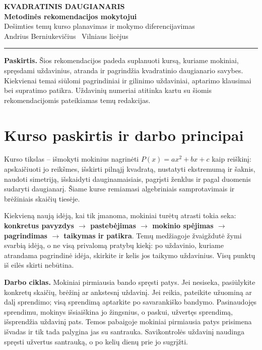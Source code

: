 \documentclass[11pt,a4paper]{article}
\begin{document}
\begin{center}
{\large\sffamily\bfseries KVADRATINIS DAUGIANARIS}\\[5pt]
{\LARGE\bfseries Metodinės rekomendacijos mokytojui}\\[5pt]
{\small Dešimties temų kurso planavimas ir mokymo diferencijavimas}\\[5pt]
{\small Andrius Berniukevičius \textbar\ Vilniaus licėjus}\\[4pt]
\rule{0.72\textwidth}{0.4pt}
\end{center}
\begin{tcolorbox}[colback=black!3,colframe=black!65,boxrule=0.5pt,arc=2mm]
\textbf{Paskirtis.} Šios rekomendacijos padeda suplanuoti kursą, kuriame mokiniai, spręsdami uždavinius, atranda ir pagrindžia kvadratinio daugianario savybes. Kiekvienai temai siūlomi pagrindiniai ir gilinimo uždaviniai, aptarimo klausimai bei supratimo patikra. Uždavinių numeriai atitinka kartu su šiomis rekomendacijomis pateikiamas temų redakcijas.
\end{tcolorbox}
\tableofcontents
\section*{Kurso paskirtis ir darbo principai}
Kurso tikslas – išmokyti mokinius nagrinėti $P(x)=ax^2+bx+c$ kaip reiškinį: apskaičiuoti jo reikšmes, išskirti pilnąjį kvadratą, nustatyti ekstremumą ir šaknis, naudoti simetriją, išskaidyti dauginamaisiais, pagrįsti ženklus ir pagal duomenis sudaryti daugianarį. Šiame kurse remiamasi algebriniais samprotavimais ir brėžiniais skaičių tiesėje.

Kiekvieną naują idėją, kai tik įmanoma, mokiniai turėtų atrasti tokia seka: \textbf{konkretus pavyzdys $\rightarrow$ pastebėjimas $\rightarrow$ mokinio spėjimas $\rightarrow$ pagrindimas $\rightarrow$ taikymas ir patikra}. Temų medžiagoje žvaigždutė žymi svarbią idėją, o ne visą privalomą pratybų kiekį: po uždavinio, kuriame atrandama pagrindinė idėja, skirkite ir kelis jos taikymo uždavinius. Visų punktų iš eilės skirti nebūtina.

\textbf{Darbo ciklas.} Mokiniai pirmiausia bando spręsti patys. Jei nesiseka, pasiūlykite konkretų skaičių, brėžinį ar ankstesnį uždavinį. Jei reikia, pateikite užuominą ar dalį sprendimo; visą sprendimą aptarkite po savarankiško bandymo. Pasinaudojęs sprendimu, mokinys išsiaiškina jo žingsnius, o paskui, užvertęs sprendimą, išsprendžia uždavinį pats. Temos pabaigoje mokiniai pirmiausia patys prisimena išvadas ir tik tada palygina jas su santrauka. Savikontrolės uždavinį naudinga spręsti užvertus santrauką, o po kelių dienų prie jo sugrįžti.
\end{document}
